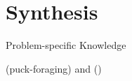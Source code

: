 \section{Synthesis}

\begin{frame}{Problem-specific Knowledge}

\cite{waibel2009genetic} (puck-foraging) and \cite{knudson2010coevolution} ()

\end{frame}
